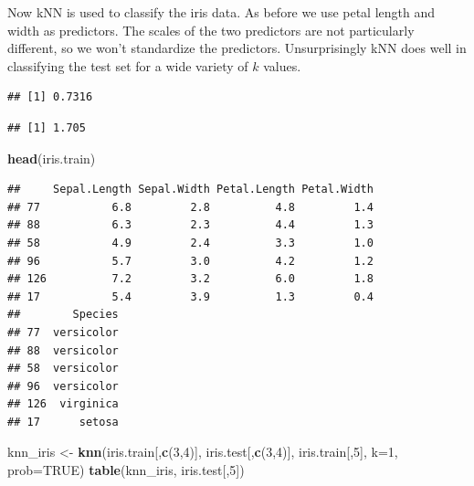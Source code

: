 \documentclass[
]{krantz}
\newenvironment{Shaded}{\begin{snugshade}}{\end{snugshade}}
\newcommand{\DataTypeTok}[1]{\textcolor[rgb]{0.13,0.29,0.53}{#1}}
\newcommand{\DecValTok}[1]{\textcolor[rgb]{0.00,0.00,0.81}{#1}}
\newcommand{\KeywordTok}[1]{\textcolor[rgb]{0.13,0.29,0.53}{\textbf{#1}}}
\newcommand{\NormalTok}[1]{#1}
\newcommand{\OperatorTok}[1]{\textcolor[rgb]{0.81,0.36,0.00}{\textbf{#1}}}
\newcommand{\OtherTok}[1]{\textcolor[rgb]{0.56,0.35,0.01}{#1}}
\newcommand{\StringTok}[1]{\textcolor[rgb]{0.31,0.60,0.02}{#1}}
\begin{document}
Now kNN is used to classify the iris data. As before we use petal length and width as predictors. The scales of the two predictors are not particularly different, so we won't standardize the predictors. Unsurprisingly kNN does well in classifying the test set for a wide variety of \(k\) values.

\begin{Shaded}
\end{Shaded}

\begin{verbatim}
## [1] 0.7316
\end{verbatim}

\begin{Shaded}
\end{Shaded}

\begin{verbatim}
## [1] 1.705
\end{verbatim}

\begin{Shaded}
\begin{Highlighting}[]
\KeywordTok{head}\NormalTok{(iris.train)}
\end{Highlighting}
\end{Shaded}

\begin{verbatim}
##     Sepal.Length Sepal.Width Petal.Length Petal.Width
## 77           6.8         2.8          4.8         1.4
## 88           6.3         2.3          4.4         1.3
## 58           4.9         2.4          3.3         1.0
## 96           5.7         3.0          4.2         1.2
## 126          7.2         3.2          6.0         1.8
## 17           5.4         3.9          1.3         0.4
##        Species
## 77  versicolor
## 88  versicolor
## 58  versicolor
## 96  versicolor
## 126  virginica
## 17      setosa
\end{verbatim}

\begin{Shaded}
\begin{Highlighting}[]
\NormalTok{knn\_iris \textless{}{-}}\StringTok{ }\KeywordTok{knn}\NormalTok{(iris.train[,}\KeywordTok{c}\NormalTok{(}\DecValTok{3}\NormalTok{,}\DecValTok{4}\NormalTok{)], iris.test[,}\KeywordTok{c}\NormalTok{(}\DecValTok{3}\NormalTok{,}\DecValTok{4}\NormalTok{)], }
\NormalTok{        iris.train[,}\DecValTok{5}\NormalTok{], }\DataTypeTok{k=}\DecValTok{1}\NormalTok{, }\DataTypeTok{prob=}\OtherTok{TRUE}\NormalTok{)}
\KeywordTok{table}\NormalTok{(knn\_iris, iris.test[,}\DecValTok{5}\NormalTok{])}
\end{Highlighting}
\end{Shaded}
\end{document}
